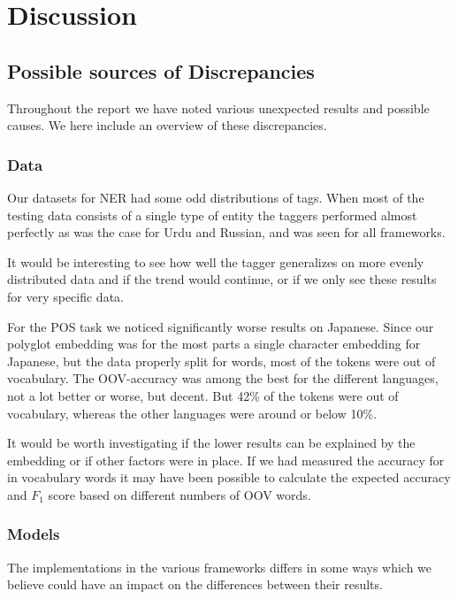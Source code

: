 
\section{Discussion}

\subsection{Possible sources of Discrepancies}

Throughout the report we have noted various unexpected results and possible
causes. We here include an overview of these discrepancies.

\subsubsection{Data}

Our datasets for NER had some odd distributions of tags. When most of the
testing data consists of a single type of entity the taggers performed almost
perfectly as was the case for Urdu and Russian, and was seen for all frameworks.

It would be interesting to see how well the tagger generalizes on more evenly
distributed data and if the trend would continue, or if we only see these
results for very specific data.

For the POS task we noticed significantly worse results on Japanese. Since our
polyglot embedding was for the most parts a single character embedding for
Japanese, but the data properly split for words, most of the tokens were out of
vocabulary. The OOV-accuracy was among the best for the different languages, not
a lot better or worse, but decent. But 42\% of the tokens were out of
vocabulary, whereas the other languages were around or below 10\%.

It would be worth investigating if the lower results can be explained by the
embedding or if other factors were in place. If we had measured the accuracy for
in vocabulary words it may have been possible to calculate the expected accuracy
and $F_1$ score based on different numbers of OOV words.

\subsubsection{Models}\label{sec:discuss_models}

The implementations in the various frameworks differs in some ways which we
believe could have an impact on the differences between their results. 

